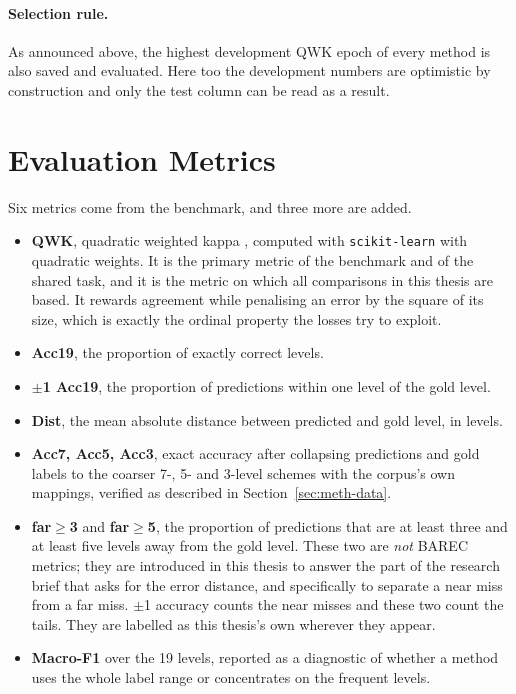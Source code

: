 \paragraph{Selection rule.} As announced above, the highest development QWK epoch of every
method is also saved and evaluated. Here too the development numbers are optimistic by
construction and only the test column can be read as a result.

\section{Evaluation Metrics}
\label{sec:meth-metrics}

Six metrics come from the benchmark, and three more are added.

\begin{itemize}
\item \textbf{QWK}, quadratic weighted kappa \cite{cohen1968kappa}, computed with
\texttt{scikit-learn} with quadratic weights. It is the primary metric of the benchmark and of
the shared task, and it is the metric on which all comparisons in this thesis are based. It
rewards agreement while penalising an error by the square of its size, which is exactly the
ordinal property the losses try to exploit.
\item \textbf{Acc19}, the proportion of exactly correct levels.
\item \textbf{$\pm$1 Acc19}, the proportion of predictions within one level of the gold level.
\item \textbf{Dist}, the mean absolute distance between predicted and gold level, in levels.
\item \textbf{Acc7, Acc5, Acc3}, exact accuracy after collapsing predictions and gold labels to
the coarser 7-, 5- and 3-level schemes with the corpus's own mappings, verified as described in
Section~\ref{sec:meth-data}.
\item \textbf{far$\geq$3} and \textbf{far$\geq$5}, the proportion of predictions that are at
least three and at least five levels away from the gold level. These two are \emph{not} BAREC
metrics; they are introduced in this thesis to answer the part of the research brief that asks
for the error distance, and specifically to separate a near miss from a far miss. $\pm$1
accuracy counts the near misses and these two count the tails. They are labelled as this
thesis's own wherever they appear.
\item \textbf{Macro-F1} over the 19 levels, reported as a diagnostic of whether a method uses
the whole label range or concentrates on the frequent levels.
\end{itemize}

